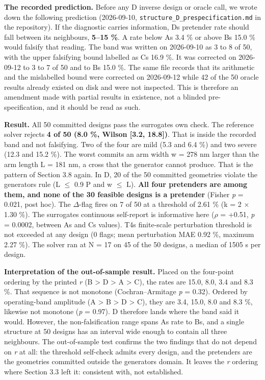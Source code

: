 \documentclass[11pt,a4paper]{article}
\newcounter{none}   %
\begin{document}
\textbf{The recorded prediction.} Before any D inverse design or oracle call, we wrote down the
following prediction (2026-09-10, \texttt{structure\_\allowbreak{}D\_\allowbreak{}prespecification.\allowbreak{}md} in the repository). If
the diagnostic carries information, D\textquotesingle s pretender rate should fall between its
neighbours\textquotesingle, \textbf{5--15 \%}. A rate below A\textquotesingle s 3.4 \% or above B\textquotesingle s 15.0 \% would falsify that
reading. The band was written on 2026-09-10 as 3 to 8 of 50, with the upper falsifying
bound labelled as C\textquotesingle s 16.9 \%. It was corrected on 2026-09-12 to 3 to 7 of 50 and to B\textquotesingle s
15.0 \%. The same file records that its arithmetic and the mislabelled bound were corrected
on 2026-09-12 while 42 of the 50 oracle results already existed on disk and were not
inspected. This is therefore an amendment made with partial results in existence, not a
blinded pre-specification, and it should be read as such.

\textbf{Result.} All 50 committed designs pass the surrogate\textquotesingle s own check. The reference solver
rejects \textbf{4 of 50 (8.0 \%, Wilson {[}3.2, 18.8{]})}. That is inside the recorded band and not
falsifying. Two of the four are mild (5.3 and 6.4 \%) and two severe (12.3 and 15.2 \%). The
worst commits an arm width w = 278 nm larger than the arm length L = 181 nm, a cross that
the generator cannot produce. That is the pattern of Section 3.8 again. In D, 20 of the 50
committed geometries violate the generator\textquotesingle s rule (L \ensuremath{\leq} 0.9 P and w \ensuremath{\leq} L). \textbf{All four
pretenders are among them, and none of the 30 feasible designs is a pretender} (Fisher
\emph{p} = 0.021, post hoc). The \ensuremath{\Delta}-flag fires on 7 of 50 at a threshold of 2.61 \%
(k = 2 \ensuremath{\times} 1.30 \%). The surrogate\textquotesingle s continuous self-report is informative here (\ensuremath{\rho} = +0.51,
\emph{p} = 0.0002, between A\textquotesingle s and C\textquotesingle s values). T4\textquotesingle s finite-scale perturbation threshold is not
exceeded at any design (0 flags; mean perturbation MAE 0.92 \%, maximum 2.27 \%). The solver
ran at N = 17 on 45 of the 50 designs, a median of 1505 s per design.

\textbf{Interpretation of the out-of-sample result.} Placed on the four-point ordering by the printed \emph{r}
(B \textgreater{} D \textgreater{} A \textgreater{} C), the rates are 15.0, 8.0, 3.4 and 8.3 \%. That sequence is not monotone
(Cochran--Armitage \emph{p} = 0.32). Ordered by operating-band amplitude (A \textgreater{} B \textgreater{} D \textgreater{} C), they
are 3.4, 15.0, 8.0 and 8.3 \%, likewise not monotone (\emph{p} = 0.97). D therefore lands where
the band said it would. However, the non-falsification range spans A\textquotesingle s rate to B\textquotesingle s, and a single structure at 50 designs has an interval wide enough to contain all three
neighbours. The out-of-sample test confirms the two findings that do not depend on \emph{r} at
all: the threshold self-check admits every design, and the pretenders are the geometries
committed outside the generator\textquotesingle s domain. It leaves the \emph{r} ordering where Section 3.3
left it: consistent with, not established.
\end{document}
